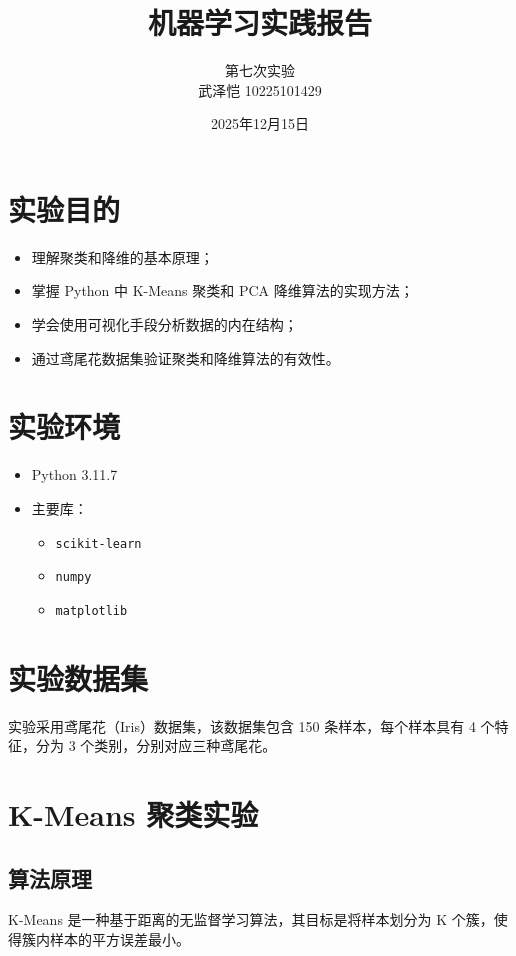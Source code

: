 \documentclass{article}
\title{\heiti\textbf{机器学习实践报告}}
\author{第七次实验 \\ 
武泽恺 10225101429
}
\date{2025年12月15日}
\begin{document}
\maketitle

\section{实验目的}
\begin{itemize}
    \item 理解聚类和降维的基本原理；
    \item 掌握 Python 中 K-Means 聚类和 PCA 降维算法的实现方法；
    \item 学会使用可视化手段分析数据的内在结构；
    \item 通过鸢尾花数据集验证聚类和降维算法的有效性。
\end{itemize}

\section{实验环境}
\begin{itemize}
    \item Python 3.11.7
    \item 主要库：
    \begin{itemize}
        \item \texttt{scikit-learn}
        \item \texttt{numpy}
        \item \texttt{matplotlib}
    \end{itemize}
\end{itemize}

\section{实验数据集}
实验采用鸢尾花（Iris）数据集，该数据集包含 150 条样本，每个样本具有 4 个特征，分为 3 个类别，分别对应三种鸢尾花。

\section{K-Means 聚类实验}

\subsection{算法原理}
K-Means 是一种基于距离的无监督学习算法，其目标是将样本划分为 K 个簇，使得簇内样本的平方误差最小。
\end{document}
